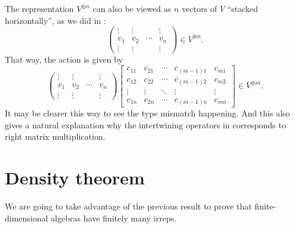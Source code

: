 \begin{remark}
	The representation $V^{\oplus n}$ can also be viewed as $n$
	vectors of $V$ ``stacked horizontally'', as we did in
	:
	\[
		\begin{pmatrix}
			\vdots & \vdots & & \vdots \\
			v_1 & v_2 & \cdots & v_n \\
			\vdots & \vdots & & \vdots
		\end{pmatrix} \in V^{\oplus n}.
	\]
	That way, the action is given by
	\[
		\begin{pmatrix}
			\vdots & \vdots & & \vdots \\
			v_1 & v_2 & \cdots & v_n \\
			\vdots & \vdots & & \vdots
		\end{pmatrix}
		\begin{bmatrix}
			c_{11} & c_{21} & \cdots & c_{(m-1)1} & c_{m1} \\
			c_{12} & c_{22} & \cdots & c_{(m-1)2} & c_{m2} \\
			\vdots & \vdots & \ddots & \vdots & \vdots \\
			c_{1n} & c_{2n} & \cdots & c_{(m-1)n} & c_{mn}
		\end{bmatrix}
		\in V^{\oplus m}.
	\]
	It may be clearer this way to see the type mismatch happening.
	And this also gives a natural explanation why the intertwining operators in
	 corresponds to right matrix multiplication.
\end{remark}

\section{Density theorem}
We are going to take advantage of the previous result to prove that
finite-dimensional algebras have finitely many irreps.

